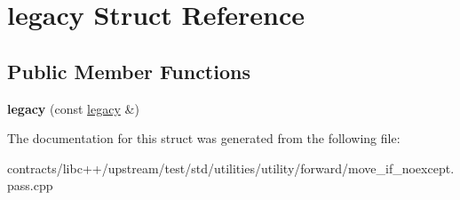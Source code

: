 \hypertarget{structlegacy}{}\section{legacy Struct Reference}
\label{structlegacy}
\subsection*{Public Member Functions}
\begin{DoxyCompactItemize}
\item 
\mbox{\label{structlegacy_ab4bfc137f4d21b6124899b03a73cd6dd}} 
{\bfseries legacy} (const \mbox{\hyperlink{structlegacy}{legacy}} \&)
\end{DoxyCompactItemize}


The documentation for this struct was generated from the following file\+:\begin{DoxyCompactItemize}
\item 
contracts/libc++/upstream/test/std/utilities/utility/forward/move\+\_\+if\+\_\+noexcept.\+pass.\+cpp\end{DoxyCompactItemize}
